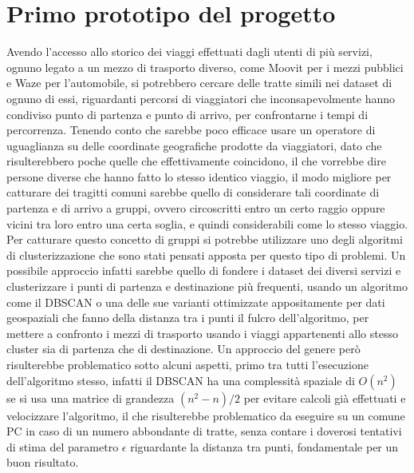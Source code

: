 \section{Primo prototipo del progetto}

Avendo l'accesso allo storico dei viaggi effettuati dagli utenti di più servizi, ognuno legato a un mezzo di trasporto diverso, come Moovit per i mezzi pubblici e Waze per l'automobile, si potrebbero cercare delle tratte simili nei dataset di ognuno di essi, riguardanti percorsi di viaggiatori che inconsapevolmente hanno condiviso punto di partenza e punto di arrivo, per confrontarne i tempi di percorrenza. Tenendo conto che sarebbe poco efficace usare un operatore di uguaglianza su delle coordinate geografiche prodotte da viaggiatori, dato che risulterebbero poche quelle che effettivamente coincidono, il che vorrebbe dire persone diverse che hanno fatto lo stesso identico viaggio, il modo migliore per catturare dei tragitti comuni sarebbe quello di considerare tali coordinate di partenza e di arrivo a gruppi, ovvero circoscritti entro un certo raggio oppure vicini tra loro entro una certa soglia, e quindi considerabili come lo stesso viaggio. Per catturare questo concetto di gruppi si potrebbe utilizzare uno degli algoritmi di clusterizzazione che sono stati pensati apposta per questo tipo di problemi. Un possibile approccio infatti sarebbe quello di fondere i dataset dei diversi servizi e clusterizzare i punti di partenza e destinazione più frequenti, usando un algoritmo come il DBSCAN \cite{ester1996density} o una delle sue varianti ottimizzate appositamente per dati geospaziali \cite{zhou2000combining}\cite{borah2004improved} che fanno della distanza tra i punti il fulcro dell'algoritmo, per mettere a confronto i mezzi di trasporto usando i viaggi appartenenti allo stesso cluster sia di partenza che di destinazione. Un approccio del genere però risulterebbe problematico sotto alcuni aspetti, primo tra tutti l'esecuzione dell'algoritmo stesso, infatti il DBSCAN ha una complessità spaziale di $O(n^2)$ se si usa una matrice di grandezza $(n^2 - n) / 2$ per evitare calcoli già effettuati e velocizzare l'algoritmo, il che risulterebbe problematico da eseguire su un comune PC in caso di un numero abbondante di tratte, senza contare i doverosi tentativi di stima del parametro $\epsilon$ riguardante la distanza tra punti, fondamentale per un buon risultato.


